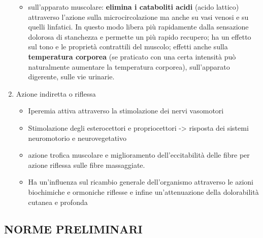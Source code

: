 \begin{enumerate}
\begin{itemize}
\item

  sull'apparato muscolare: \textbf{elimina i cataboliti acidi} (acido
  lattico) attraverso l'azione sulla microcircolazione ma anche su vasi
  venosi e su quelli linfatici. In questo modo libera più rapidamente
  dalla sensazione dolorosa di stanchezza e permette un più rapido
  recupero; ha un effetto sul tono e le proprietà contrattili del
  muscolo; effetti anche sulla \textbf{temperatura corporea} (se
  praticato con una certa intensità può naturalmente aumentare la
  temperatura corporea), sull'apparato digerente, sulle vie urinarie.

\end{itemize}


\item
  Azione indiretta o riflessa


\begin{itemize}
\item
  Iperemia attiva attraverso la stimolazione dei nervi vasomotori
\item
  Stimolazione degli esterocettori e propriocettori -> risposta dei
  sistemi neuromotorio e neurovegetativo

\item

  azione trofica muscolare e miglioramento dell'eccitabilità delle fibre
  per azione riflessa sulle fibre massaggiate.


\item
  Ha un'influenza sul ricambio generale dell'organismo attraverso le
  azioni biochimiche e ormoniche riflesse e infine un'attenuazione della
  dolorabilità cutanea e profonda
\end{itemize}
\end{enumerate}
\subsection{NORME PRELIMINARI}


